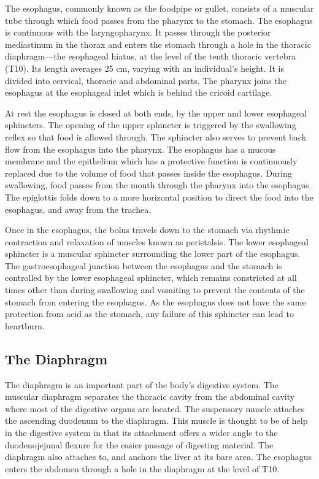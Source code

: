 The esophagus, commonly known as the foodpipe or gullet, consists of a muscular tube through which food passes from the pharynx to the stomach. The esophagus is continuous with the laryngopharynx. It passes through the posterior mediastinum in the thorax and enters the stomach through a hole in the thoracic diaphragm---the esophageal hiatus, at the level of the tenth thoracic vertebra (T10). Its length averages 25 cm, varying with an individual's height. It is divided into cervical, thoracic and abdominal parts. The pharynx joins the esophagus at the esophageal inlet which is behind the cricoid cartilage.

At rest the esophagus is closed at both ends, by the upper and lower esophageal sphincters. The opening of the upper sphincter is triggered by the swallowing reflex so that food is allowed through. The sphincter also serves to prevent back flow from the esophagus into the pharynx. The esophagus has a mucous membrane and the epithelium which has a protective function is continuously replaced due to the volume of food that passes inside the esophagus. During swallowing, food passes from the mouth through the pharynx into the esophagus. The epiglottis folds down to a more horizontal position to direct the food into the esophagus, and away from the trachea.

Once in the esophagus, the bolus travels down to the stomach via rhythmic contraction and relaxation of muscles known as peristalsis. The lower esophageal sphincter is a muscular sphincter surrounding the lower part of the esophagus. The gastroesophageal junction between the esophagus and the stomach is controlled by the lower esophageal sphincter, which remains constricted at all times other than during swallowing and vomiting to prevent the contents of the stomach from entering the esophagus. As the esophagus does not have the same protection from acid as the stomach, any failure of this sphincter can lead to heartburn.

\hypertarget{the-diaphragm}{%
\subsection{The Diaphragm}\label{the-diaphragm}}

The diaphragm is an important part of the body's digestive system. The muscular diaphragm separates the thoracic cavity from the abdominal cavity where most of the digestive organs are located. The suspensory muscle attaches the ascending duodenum to the diaphragm. This muscle is thought to be of help in the digestive system in that its attachment offers a wider angle to the duodenojejunal flexure for the easier passage of digesting material. The diaphragm also attaches to, and anchors the liver at its bare area. The esophagus enters the abdomen through a hole in the diaphragm at the level of T10.

